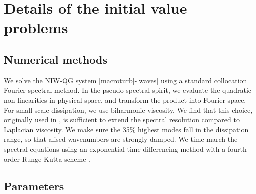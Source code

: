 \documentclass{jfm}
\begin{document}
\section{Details of the initial value problems}

\subsection{Numerical methods}
We solve the NIW-QG system \eqref{macroturb}-\eqref{waves} using a standard
collocation Fourier spectral method.
In the pseudo-spectral spirit, we evaluate  the quadratic non-linearities in
physical space, and transform the product into Fourier space. For small-scale
dissipation, we use biharmonic viscosity. We find that this choice, originally
used in \cite{mcwilliams1984}, is sufficient
to extend the spectral resolution compared to Laplacian viscosity.
We make sure the 35$\%$ highest modes fall in the dissipation range, so that alised
wavenumbers are strongly damped. We time march the spectral equations
using an exponential time differencing method with a fourth order Runge-Kutta scheme
\citep[details in][]{kassam_trefethen2005}.

\subsection{Parameters}






\end{document}
